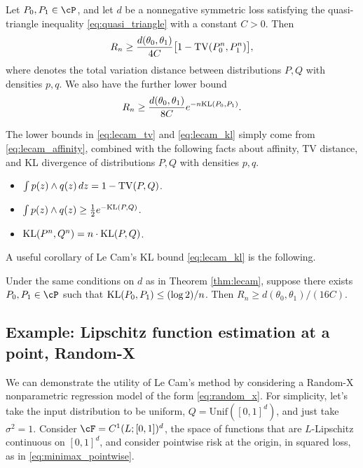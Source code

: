 \documentclass{article}
\begin{document}
\begin{theorem}
\label{thm:lecam}
Let $P_0,P_1 \in \cP$, and let $d$ be a nonnegative symmetric loss satisfying
the quasi-triangle inequality \eqref{eq:quasi_triangle} with a constant
$C>0$. Then 
\begin{equation}
\label{eq:lecam_tv}
R_n \geq \frac{d(\theta_0, \theta_1)}{4C} \big[ 1 - \mathrm{TV}(P_0^n, P_1^n) \big], 
\end{equation}
where  denotes the
total variation distance between distributions $P,Q$ with densities
$p,q$. We also have the further lower bound
\begin{equation}
\label{eq:lecam_kl}
R_n \geq \frac{d(\theta_0, \theta_1)}{8C} e^{-n \mathrm{KL}(P_0, P_1)}. 
\end{equation}
\end{theorem}

The lower bounds in \eqref{eq:lecam_tv} and \eqref{eq:lecam_kl} simply come from
\eqref{eq:lecam_affinity}, combined with the following facts about affinity, TV
distance, and KL divergence of distributions $P,Q$ with densities $p,q$.   

\begin{itemize}
\item $\int p(z) \wedge q(z) \, dz = 1 - \mathrm{TV}(P,Q)$.
\item $\int p(z) \wedge q(z) \geq \frac{1}{2} e^{-\mathrm{KL}(P,Q)}$.
\item $\mathrm{KL}(P^n,Q^n) = n \cdot \mathrm{KL}(P,Q)$.
\end{itemize}

A useful corollary of Le Cam's KL bound \eqref{eq:lecam_kl} is the following. 

\begin{corollary}
\label{cor:lecam}
Under the same conditions on $d$ as in Theorem \ref{thm:lecam}, suppose there 
exists $P_0,P_1 \in \cP$ such that $\mathrm{KL}(P_0,P_1) \leq (\log 2)/n$. Then $R_n
\geq d(\theta_0, \theta_1)/(16 C)$.  
\end{corollary}

\subsection{Example: Lipschitz function estimation at a point, Random-X} 
\label{sec:lipschitz_pointwise}

We can demonstrate the utility of Le Cam's method by considering a Random-X
nonparametric regression model of the form \eqref{eq:random_x}. For simplicity,
let's take the input distribution to be uniform, $Q = \mathrm{Unif}([0,1]^d)$,
and just take $\sigma^2 = 1$. Consider $\cF = C^1(L; [0,1])^d$, the space of
functions that are $L$-Lipschitz continuous on $[0,1]^d$, and consider pointwise
risk at the origin, in squared loss, as in \eqref{eq:minimax_pointwise}.     
\end{document}
